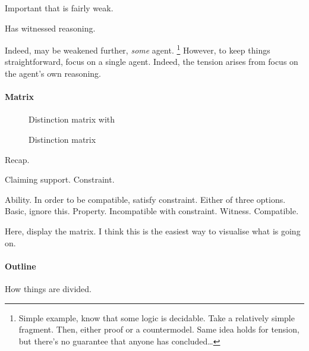 \begin{note}
  Important that \ESU{} is fairly weak.

  Has witnessed reasoning.

  Indeed, \ESU{} may be weakened further, \emph{some} agent.\nolinebreak
  \footnote{
    Simple example, know that some logic is decidable.
    Take a relatively simple fragment.
    Then, either proof or a countermodel.
    Same idea holds for tension, but there's no guarantee that anyone has concluded\dots
  }
  However, to keep things straightforward, focus on a single agent.
  Indeed, the tension arises from focus on the agent's own reasoning.
\end{note}

\paragraph{Matrix}

\begin{note}
  \begin{figure}[H]
    \centering
    \saMtxInterpreted{}
    \caption{Distinction matrix with }
    \label{fig:saMtxInterpreted:outline}
  \end{figure}
\end{note}

\begin{note}
  \begin{figure}[H]
    \centering
    \saMtxRuledOut{}
    \caption{Distinction matrix}
    \label{fig:saMtxRuledOut:outline}
  \end{figure}
\end{note}

\begin{note}
  Recap.

  Claiming support.
  Constraint.

  Ability.
  In order to be compatible, satisfy constraint.
  Either of three options.
  Basic, ignore this.
  Property. Incompatible with constraint.
  Witness. Compatible.

  Here, display the matrix.
  I think this is the easiest way to visualise what is going on.
\end{note}

\paragraph{Outline}

\begin{note}
  How things are divided.
\end{note}

